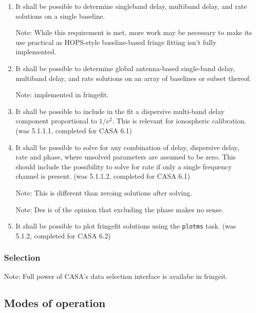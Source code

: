 \documentclass[11pt,a4paper]{article}
\begin{document}
\begin{enumerate}[subsubseclist]

\item It shall be possible to determine singleband delay, multiband
  delay, and rate solutions on a single baseline.

  Note: While this requirement is met, more work may be necessary to
  make its use practical as HOPS-style baseline-based fringe fitting
  isn't fully implemented.

\item It shall be possible to determine global antenna-based
  single-band delay, multiband delay, and rate solutions on an array
  of baselines or subset thereof.

  Note: implemented in fringefit.

\item It shall be possible to include in the fit a dispersive
  multi-band delay component proportional to $1/\nu^2$. This is
  relevant for ionospheric calibration.  (was 5.1.1.1, completed for CASA 6.1)

\item It shall be possible to solve for any combination of delay,
  dispersive delay, rate and phase, where unsolved parameters are
  assumed to be zero.  This should include the possibility to solve
  for rate if only a single frequency channel is present.  (was
  5.1.1.2, completed for CASA 6.1)

  Note: This is different than zeroing solutions after solving.
  
  Note: Des is of the opinion that excluding the phase makes no sense.

\item It shall be possible to plot fringefit solutions using the
  \texttt{plotms} task.  (was 5.1.2, completed for CASA 6.2)

\end{enumerate}

\subsubsection{Selection}

Note: Full power of CASA's data selection interface is availabe in fringeit.

\subsection{Modes of operation}
\end{document}
